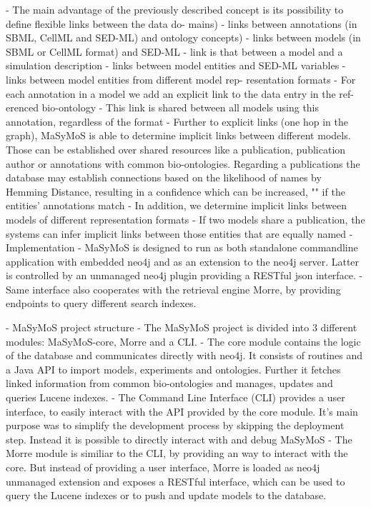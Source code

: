 			- \cite{Henkel2015} The main advantage of the previously described concept is its possibility to define flexible links between the data do- mains)
			- \cite{Henkel2015} links between annotations (in SBML, CellML and SED-ML) and ontology concepts)
			- \cite{Henkel2015} links between models (in SBML or CellML format) and SED-ML
			- \cite{Henkel2015} link is that between a model and a simulation description
			- \cite{Henkel2015} links between model entities and SED-ML variables
			- \cite{Henkel2015} links between model entities from different model rep- resentation formats
		- \cite{Henkel2015} For each annotation in a model we add an explicit link to the data entry in the ref- erenced bio-ontology
		- This link is shared between all models using this annotation, regardless of the format
		- Further to explicit links (one hop in the graph), MaSyMoS is able to determine implicit links between different models. Those can be established over shared resources like a publication, publication author or annotations with common bio-ontologies. Regarding a publications the database may establish connections based on the likelihood of names by Hemming Distance, resulting in a confidence which can be increased, "" if the entities' annotations match
			- \cite{Henkel2015} In addition, we determine implicit links between models of different representation formats
			- \cite{Henkel2015} If two models share a publication, the systems can infer implicit links between those entities that are equally named
	- Implementation
		- MaSyMoS is designed to run as both standalone commandline application with embedded neo4j and as an extension to the neo4j server. Latter is controlled by an unmanaged neo4j plugin providing a RESTful json interface.
		- Same interface also cooperates with the retrieval engine Morre, by providing endpoints to query different search indexes.
		
	- MaSyMoS project structure
		- The MaSyMoS project is divided into 3 different modules: MaSyMoS-core, Morre and a CLI.
		- The core module contains the logic of the database and communicates directly with neo4j. It consists of routines and a Java API to import models, experiments and ontologies. Further it fetches linked information from common bio-ontologies and manages, updates and queries Lucene indexes.
		- The Command Line Interface (CLI) provides a user interface, to easily interact with the API provided by the core module. It's main purpose was to simplify the development process by skipping the deployment step. Instead it is possible to directly interact with and debug MaSyMoS
		- The Morre module is similiar to the CLI, by providing an way to interact with the core. But instead of providing a user interface, Morre is loaded as neo4j unmanaged extension and exposes a RESTful interface, which can be used to query the Lucene indexes or to push and update models to the database.
	